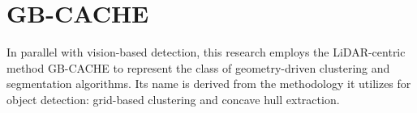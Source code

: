 \documentclass{erauthesis}
\begin{document}

\section{GB-CACHE} \label{gbcache}

In parallel with vision-based detection, this research employs the LiDAR-centric method GB-CACHE to represent the class of geometry-driven clustering and segmentation algorithms.
Its name is derived from the methodology it utilizes for object detection: grid-based clustering and concave hull extraction.
\end{document}
